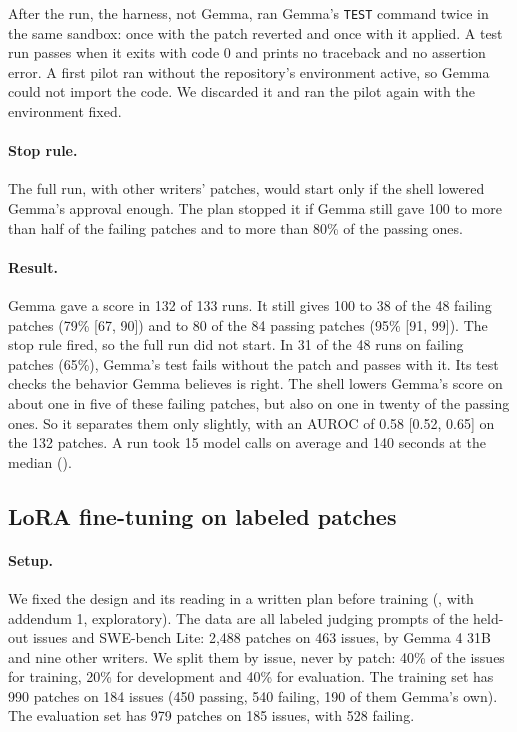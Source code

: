 \documentclass[10pt,letterpaper]{article}
\begin{document}
After the run, the harness, not Gemma, ran Gemma's \texttt{TEST} command twice in the same sandbox: once with the
patch reverted and once with it applied. A test run passes when it exits with code 0 and prints no traceback and no
assertion error. A first pilot ran without the repository's environment active, so Gemma could not import the code.
We discarded it and ran the pilot again with the environment fixed.

\paragraph{Stop rule.} The full run, with other writers' patches, would start only if the shell lowered Gemma's
approval enough. The plan stopped it if Gemma still gave 100 to more than half of the failing patches and to more
than 80\% of the passing ones.

\paragraph{Result.} Gemma gave a score in 132 of 133 runs. It still gives 100 to 38 of the 48 failing patches (79\%
[67, 90]) and to 80 of the 84 passing patches (95\% [91, 99]). The stop rule fired, so the full run did not start. In
31 of the 48 runs on failing patches (65\%), Gemma's test fails without the patch and passes with it. Its test checks
the behavior Gemma believes is right. The shell lowers Gemma's score on about one in five of these failing patches,
but also on one in twenty of the passing ones. So it separates them only slightly, with an AUROC of 0.58 [0.52, 0.65]
on the 132 patches. A run took 15 model calls on average and 140 seconds at the median
().

\subsection*{LoRA fine-tuning on labeled patches}

\paragraph{Setup.} We fixed the design and its reading in a written plan before training (,
with addendum 1, exploratory). The data are all labeled judging prompts of the held-out issues and SWE-bench Lite:
2,488 patches on 463 issues, by Gemma 4 31B and nine other writers. We split them by issue, never by patch: 40\% of
the issues for training, 20\% for development and 40\% for evaluation. The training set has 990 patches on 184
issues (450 passing, 540 failing, 190 of them Gemma's own). The evaluation set has 979 patches on 185 issues, with
528 failing.
\end{document}
